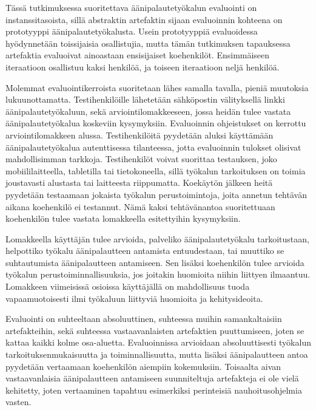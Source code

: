 \documentclass[utf8]{gradu3}
\begin{document}
Tässä tutkimuksessa suoritettava äänipalautetyökalun evaluointi on instanssitasoista, sillä abstraktin artefaktin sijaan evaluoinnin kohteena on prototyyppi äänipalautetyökalusta. Usein prototyyppiä evaluoidessa hyödynnetään toissijaisia osallistujia, mutta tämän tutkimuksen tapauksessa artefaktia evaluoivat ainoastaan ensisijaiset koehenkilöt. Ensimmäiseen iteraatioon osallistuu kaksi henkilöä, ja toiseen iteraatioon neljä henkilöä.

Molemmat evaluointikerroista suoritetaan lähes samalla tavalla, pieniä muutoksia lukuunottamatta. Testihenkilöille lähetetään sähköpostin välityksellä linkki äänipalautetyökaluun, sekä arviointilomakkeeseen, jossa heidän tulee vastata äänipalautetyökalua koskeviin kysymyksiin. Evaluoinnin ohjeistukset on kerrottu arviointilomakkeen alussa. Testihenkilöitä pyydetään aluksi käyttämään äänipalautetyökalua autenttisessa tilanteessa, jotta evaluoinnin tulokset olisivat mahdollisimman tarkkoja. Testihenkilöt voivat suorittaa testauksen, joko mobiililaitteella, tabletilla tai tietokoneella, sillä työkalun tarkoituksen on toimia joustavasti alustasta tai laitteesta riippumatta. Koekäytön jälkeen heitä pyydetään testaamaan jokaista työkalun perustoimintoja, joita annetun tehtävän aikana koehenkilö ei testannut. Nämä kaksi tehtävänantoa suoritettuaan koehenkilön tulee vastata lomakkeella esitettyihin kysymyksiin. 

Lomakkeella käyttäjän tulee arvioida, palveliko äänipalautetyökalu tarkoitustaan, helpottiko työkalu äänipalautteen antamista entuudestaan, tai muuttiko se suhtautumista äänipalautteen antamiseen. Sen lisäksi koehenkilön tulee arvioida työkalun perustoiminnallisuuksia, jos joitakin huomioita niihin liittyen ilmaantuu. Lomakkeen viimeisissä osioissa käyttäjällä on mahdollisuus tuoda vapaamuotoisesti ilmi työkaluun liittyviä huomioita ja kehitysideoita.

Evaluointi on suhteeltaan absoluuttinen, suhteessa muihin samankaltaisiin artefakteihin, sekä suhteessa vastaavanlaisten artefaktien puuttumiseen, joten se kattaa kaikki kolme osa-aluetta. Evaluoinnissa arvioidaan absoluuttisesti työkalun tarkoituksenmukaisuutta ja toiminnallisuutta, mutta lisäksi äänipalautteen antoa pyydetään vertaamaan koehenkilön aiempiin kokemuksiin. Toisaalta aivan vastaavanlaisia äänipalautteen antamiseen suunniteltuja artefakteja ei ole vielä kehitetty, joten vertaaminen tapahtuu esimerkiksi perinteisiä nauhoitusohjelmia vasten.
\end{document}
